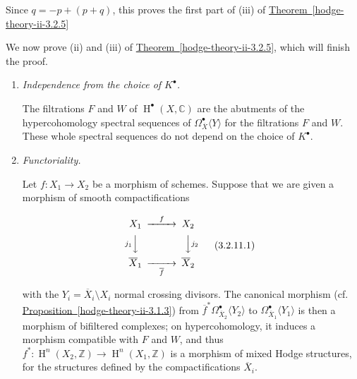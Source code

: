   Since \(q=-p+(p+q)\), this proves the first part of (iii) of \hyperref[hodge-theory-ii-3.2.5]{Theorem~\ref*{hodge-theory-ii-3.2.5}}\label{hodge-theory-ii-3.2.11}\par{}We now prove (ii) and (iii) of \hyperref[hodge-theory-ii-3.2.5]{Theorem~\ref*{hodge-theory-ii-3.2.5}}, which will finish the proof.\begin{enumerate}
    
 \item[(A)]
      \par{}\emph{Independence from the choice of \(K^\bullet \).}

      \par{}The filtrations \(F\) and \(W\) of \(\operatorname {H}^\bullet (X,\mathbb {C})\) are the abutments of the hypercohomology spectral sequences of \(\Omega _{\overline {X}}^\bullet \langle  Y\rangle \) for the filtrations \(F\) and \(W\).
        These whole spectral sequences do not depend on the choice of \(K^\bullet \).
    


    
 \item[(B)]
      \par{}\emph{Functoriality.}

      \par{}Let \(f\colon  X_1\to  X_2\) be a morphism of schemes.
        Suppose that we are given a morphism of smooth compactifications

        \label{hodge-theory-ii-3.2.11.1}\[             \begin {CD}               X_1 @>f>> X_2             \\@V{j_1}VV @VV{j_2}V             \\\overline {X}_1 @>>{\overline {f}}> \overline {X}_2             \end {CD}           \tag{3.2.11.1}           \]

        with the \(Y_i=\overline {X}_i\setminus  X_i\) normal crossing divisors.
        The canonical morphism (cf. \hyperref[hodge-theory-ii-3.1.3]{Proposition~\ref*{hodge-theory-ii-3.1.3}}) from \(\overline {f}^*\Omega _{\overline {X}_2}^\bullet \langle  Y_2\rangle \) to \(\Omega _{\overline {X}_1}^\bullet \langle  Y_1\rangle \) is then a morphism of bifiltered complexes;
        on hypercohomology, it induces a morphism compatible with \(F\) and \(W\), and thus \(f^*\colon \operatorname {H}^n(X_2,\mathbb {Z})\to \operatorname {H}^n(X_1,\mathbb {Z})\) is a morphism of mixed Hodge structures, for the structures defined by the compactifications \(\overline {X}_i\).
    



\end{enumerate}
